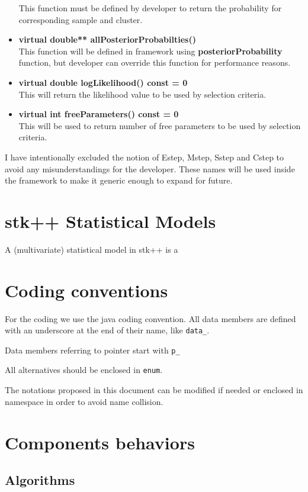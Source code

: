 \documentclass[a4paper,11pt]{article}
\begin{document}
\begin{itemize}
This function must be defined by developer to return the probability for corresponding sample and cluster.
\item {\bf virtual double** allPosteriorProbabilties()}\\
This function will be defined in framework using {\bf posteriorProbability} function, but developer
can override this function for performance reasons.
\item {\bf virtual double logLikelihood() const = 0}\\
This will return the likelihood value to be used by selection criteria.
\item {\bf virtual int freeParameters() const = 0}\\
This will be used to return number of free parameters to be used by selection criteria.
\end{itemize}

I have intentionally excluded the notion of Estep, Mstep, Sstep and Cstep to avoid any
misunderstandings for the developer.  These names will be used inside the framework to make
it generic enough to expand for future.

\section{stk++ Statistical Models}

A (multivariate) statistical model in stk++ is a


\appendix

\section{Coding conventions}

For the coding we use the java coding convention. All data members
are defined with an underscore at the end of their name, like \verb+data_+.

Data members referring to pointer start with \verb+p_+

All alternatives should be enclosed in \verb+enum+.

The notations proposed in this document can be modified if needed
or enclosed in namespace in order to avoid name collision.


\section{Components behaviors}
\subsection{Algorithms}
\end{document}
